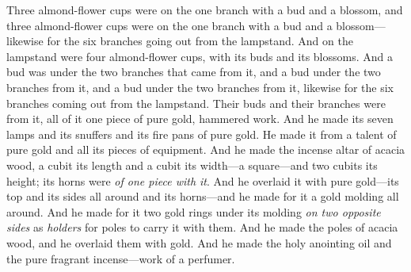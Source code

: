 \begin{biblechapter}
\verse Three almond-flower cups were on the one branch with a bud and a blossom, and three almond-flower cups were on the one branch with a bud and a blossom—likewise for the six branches going out from the lampstand.
\verse And on the lampstand were four almond-flower cups, with its buds and its blossoms.
\verse And a bud was under the two branches that came from it, and a bud under the two branches from it, and a bud under the two branches from it, likewise for the six branches coming out from the lampstand.
\verse Their buds and their branches were from it, all of it one piece of pure gold, hammered work.
\verse And he made its seven lamps and its snuffers and its fire pans of pure gold.
\verse He made it from a talent of pure gold and all its pieces of equipment.
 And he made the incense altar of acacia wood, a cubit its length and a cubit its width—a square—and two cubits its height; its horns were \textit{of one piece with it}.
\verse And he overlaid it with pure gold—its top and its sides all around and its horns—and he made for it a gold molding all around.
\verse And he made for it two gold rings under its molding \textit{on two opposite sides} as \textit{holders} for poles to carry it with them.
\verse And he made the poles of acacia wood, and he overlaid them with gold.
\verse And he made the holy anointing oil and the pure fragrant incense—work of a perfumer.
\end{biblechapter}

